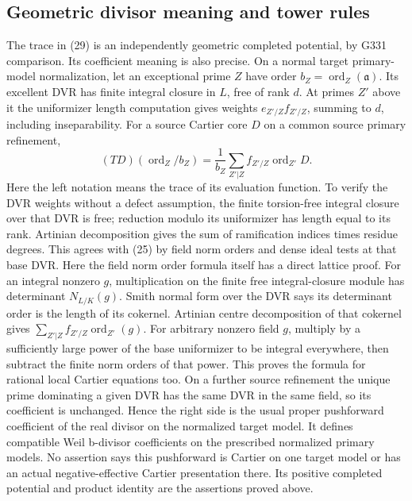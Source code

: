 \subsection*{Geometric divisor meaning and tower rules}
The trace in (29) is an independently geometric completed
potential, by G331 comparison. Its coefficient meaning is also
precise. On a normal target primary-model normalization, let
an exceptional prime \(Z\) have order \(b_Z=\operatorname{ord}_Z
(\mathfrak a)\). Its excellent DVR has finite integral closure
in \(L\), free of rank \(d\). At primes \(Z'\) above it the
uniformizer length computation gives weights
\(e_{Z'/Z}f_{Z'/Z}\), summing to \(d\), including inseparability.
For a source Cartier core \(D\) on a common source primary
refinement,
\[
 (TD)(\operatorname{ord}_Z/b_Z)
       =\frac1{b_Z}\sum_{Z'|Z}f_{Z'/Z}\operatorname{ord}_{Z'}D.
                                                               \tag{32}
\]
Here the left notation means the trace of its evaluation
function. To verify the DVR weights without a defect
assumption, the finite torsion-free integral closure over
that DVR is free; reduction modulo its uniformizer has
length equal to its rank. Artinian decomposition gives
the sum of ramification indices times residue degrees.
This agrees with (25) by field norm orders and dense ideal
tests at that base DVR.
Here the field norm order formula itself has a direct lattice
proof. For an integral nonzero \(g\), multiplication on the
finite free integral-closure module has determinant
\(N_{L/K}(g)\). Smith normal form over the DVR says its
determinant order is the length of its cokernel.
Artinian centre decomposition of that cokernel gives
\(\sum_{Z'|Z}f_{Z'/Z}\operatorname{ord}_{Z'}(g)\).
For arbitrary nonzero field \(g\), multiply by a sufficiently
large power of the base uniformizer to be integral everywhere,
then subtract the finite norm orders of that power. This
proves the formula for rational local Cartier equations too.
On a further source refinement the unique prime dominating
a given DVR has the same DVR in the same field, so its
coefficient is unchanged. Hence the right side is the
usual proper pushforward coefficient of the real divisor
on the normalized target model. It defines compatible Weil
b-divisor coefficients on the prescribed normalized primary
models. No assertion says this pushforward is Cartier on
one target model or has an actual negative-effective
Cartier presentation there. Its positive completed potential
and product identity are the assertions proved above.

